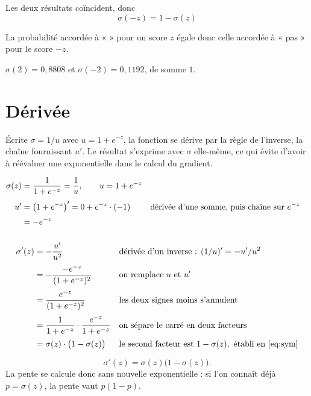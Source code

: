 Les deux résultats coïncident, donc
\[
  \boxed{\;\sigma(-z)=1-\sigma(z)\;}
\]

La probabilité accordée à « \Gryf » pour un score $z$ égale donc celle
accordée à « pas \Gryf » pour le score $-z$.

\begin{releve}
$\sigma(2)=0{,}8808$ et $\sigma(-2)=0{,}1192$, de somme $1$.
\end{releve}

\section{Dérivée}

Écrite $\sigma=1/u$ avec $u=1+e^{-z}$, la fonction se dérive par la règle de
l'inverse, la chaîne fournissant $u'$. Le résultat s'exprime avec $\sigma$
elle-même, ce qui évite d'avoir à réévaluer une exponentielle dans le calcul du
gradient.

\begin{align}
  \sigma(z) &= \frac{1}{1+e^{-z}} = \frac{1}{u},\qquad u=1+e^{-z} \notag\\[4pt]
  u' &= \bigl(1+e^{-z}\bigr)'
     = 0+e^{-z}\cdot(-1)
    &&\text{dérivée d'une somme, puis chaîne sur } e^{-z} \notag\\[2pt]
     &= -e^{-z} \notag\\[6pt]
\end{align}

\slidebreak

\begin{align}
  \sigma'(z) &= -\frac{u'}{u^{2}}
    &&\text{dérivée d'un inverse : } (1/u)'=-u'/u^{2} \notag\\[2pt]
  &= -\frac{-e^{-z}}{(1+e^{-z})^{2}}
    &&\text{on remplace } u \text{ et } u' \notag\\[2pt]
  &= \frac{e^{-z}}{(1+e^{-z})^{2}}
    &&\text{les deux signes moins s'annulent} \notag\\[2pt]
  &= \frac{1}{1+e^{-z}}\cdot\frac{e^{-z}}{1+e^{-z}}
    &&\text{on sépare le carré en deux facteurs} \notag\\[2pt]
  &= \sigma(z)\cdot\bigl(1-\sigma(z)\bigr)
    &&\text{le second facteur est } 1-\sigma(z),\ \text{établi en \eqref{eq:sym}}
\end{align}

\begin{resultat}
\[
  \sigma'(z)=\sigma(z)\bigl(1-\sigma(z)\bigr).
\]
La pente se calcule donc sans nouvelle exponentielle : si l'on connaît déjà
$p=\sigma(z)$, la pente vaut $p(1-p)$.
\end{resultat}

